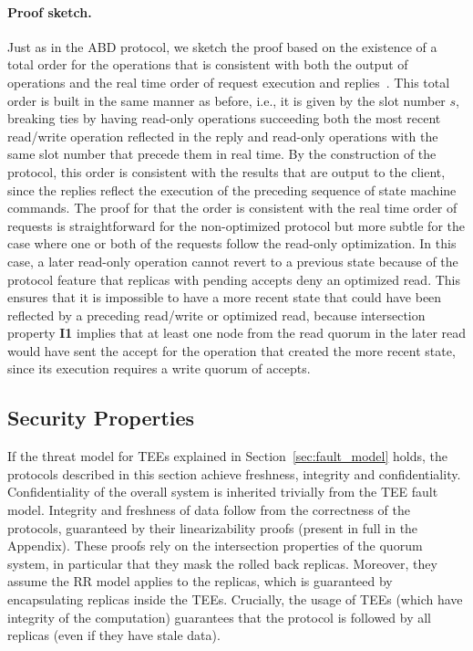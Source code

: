 \paragraph{Proof sketch.}
Just as in the \ac{ABD} protocol, we sketch the proof based on
the existence of a total order for the operations that is
consistent with both the output of operations and the real time
order of request execution and replies~\cite{nancy-book}. This
total order is built in the same manner as before, i.e., it is
given by the slot number $s$, breaking ties by having read-only
operations succeeding both the most recent read/write operation
reflected in the reply and read-only operations with the
same slot number that precede them in real time. By the
construction of the protocol, this order is consistent with the
results that are output to the client, since the replies reflect
the execution of the preceding sequence of state machine commands.
The proof for that the order is consistent with
the real time order of requests is straightforward for the
non-optimized protocol but more subtle for the case where one or
both of the requests follow the read-only optimization.
In this case, a later read-only operation cannot revert to a
previous state because of the protocol feature that replicas with
pending accepts deny an optimized read.  This ensures that
it is impossible to have a more recent state
that could have been reflected by a preceding read/write or
optimized read, because intersection property \textbf{I1} implies
that at least one node from the read quorum in the later read
would have sent the accept for the operation that created the
more recent state, since its execution requires a write quorum of
accepts.


\subsection{Security Properties}\label{ssec:sec_prop}
If the threat model for \acp{TEE} explained in
Section~\ref{sec:fault_model} holds, the protocols described in this
section achieve freshness, integrity and confidentiality.
Confidentiality of the overall system is inherited trivially from the
\ac{TEE} fault model. Integrity and freshness of data follow from the
correctness of the protocols, guaranteed by their linearizability
proofs (present in full in the Appendix). These proofs rely on
the intersection properties of the quorum system, in particular
that they mask the rolled back replicas. Moreover, they assume the
\ac{RR} model applies to the replicas, which is
guaranteed by encapsulating replicas inside the \acp{TEE}. Crucially,
the usage of \acp{TEE} (which have integrity of the computation)
guarantees that the protocol is followed by all replicas (even if
they have stale data).

